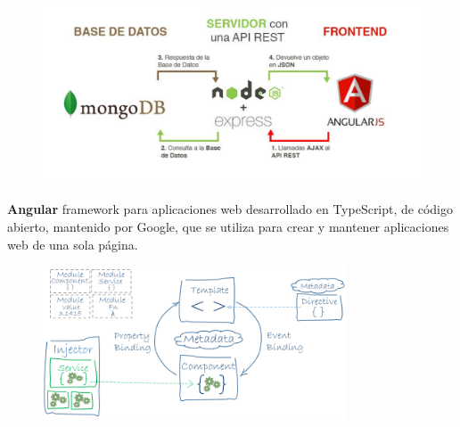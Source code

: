 \documentclass[notes,slidesec,a4]{seminar}
\begin{document}

\begin{hslide}
\begin{figure}
\centering
\includegraphics[width=12cm]{img/scheme.png}
\end{figure}
\end{hslide}



\begin{hslide}
\textbf {Angular} framework para aplicaciones web desarrollado en TypeScript, de código abierto, mantenido por Google, que se utiliza para crear y mantener aplicaciones web de una sola página.
\begin{figure}
\centering
\includegraphics[width=9cm]{img/angular2Architecture.png}
\end{figure}
\end{hslide}

\end{document}
